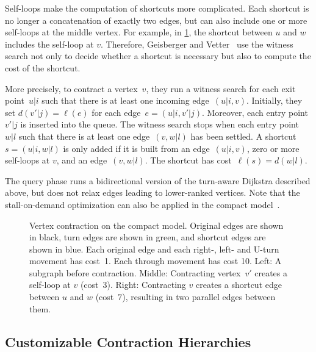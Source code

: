 \documentclass[a4paper, english, cleveref]{lipics-v2021}
\begin{document}
Self-loops make the computation of shortcuts more complicated. Each shortcut is no longer a concatenation of exactly two edges, but can also include one or more self-loops at the middle vertex. For example, in \cref{fig:contract-on-compact-model}, the shortcut between $u$ and $w$ includes the self-loop at $v$. Therefore, Geisberger and Vetter~\cite{GeisbergerV11} use the witness search not only to decide whether a shortcut is necessary but also to compute the cost of the shortcut.

More precisely, to contract a vertex~$v$, they run a witness search for each exit point~$u|i$ such that there is at least one incoming edge~$(u|i, v)$. Initially, they set $d(v'|j) = \ell(e)$ for each edge~$e = (u|i, v'|j)$. Moreover, each entry point~$v'|j$ is inserted into the queue. The witness search stops when each entry point~$w|l$ such that there is at least one edge~$(v, w|l)$ has been settled. A shortcut~$s = (u|i, w|l)$ is only added if it is built from an edge~$(u|i, v)$, zero or more self-loops at $v$, and an edge~$(v, w|l)$. The shortcut has cost~$\ell(s) = d(w|l)$.

The query phase runs a bidirectional version of the turn-aware Dijkstra described above, but does not relax edges leading to lower-ranked vertices. Note that the stall-on-demand optimization can also be applied in the compact model~\cite{GeisbergerV11}.

\begin{figure}[tb]
  \hfill
  \hfill
  
  \caption{Vertex contraction on the compact model. Original edges are shown in black, turn edges are shown in green, and shortcut edges are shown in blue. Each original edge and each right-, left- and U-turn movement has cost~1. Each through movement has cost 10. Left: A subgraph before contraction. Middle: Contracting vertex~$v'$ creates a self-loop at $v$ (cost~3). Right: Contracting $v$ creates a shortcut edge between $u$ and $w$ (cost~7), resulting in two parallel edges between them.}
  \label{fig:contract-on-compact-model}
\end{figure}

\subsection{Customizable Contraction Hierarchies}
\end{document}
